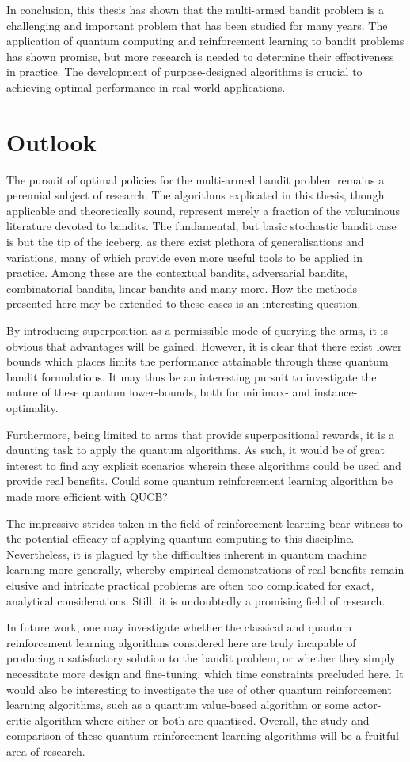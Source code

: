 In conclusion, this thesis has shown that the multi-armed bandit problem is a challenging and important problem that has been studied for many years.
The application of quantum computing and reinforcement learning to bandit problems has shown promise, but more research is needed to determine their effectiveness in practice.
The development of purpose-designed algorithms is crucial to achieving optimal performance in real-world applications.

\section{Outlook}
The pursuit of optimal policies for the multi-armed bandit problem remains a perennial subject of research.
The algorithms explicated in this thesis, though applicable and theoretically sound, represent merely a fraction of the voluminous literature devoted to bandits.
The fundamental, but basic stochastic bandit case is but the tip of the iceberg, as there exist plethora of generalisations and variations, many of which provide even more useful tools to be applied in practice.
Among these are the contextual bandits, adversarial bandits, combinatorial bandits, linear bandits and many more.
How the methods presented here may be extended to these cases is an interesting question.

By introducing superposition as a permissible mode of querying the arms, it is obvious that advantages will be gained.
However, it is clear that there exist lower bounds which places limits the performance attainable through these quantum bandit formulations.
It may thus be an interesting pursuit to investigate the nature of these quantum lower-bounds, both for minimax- and instance-optimality.

Furthermore, being limited to arms that provide superpositional rewards, it is a daunting task to apply the quantum algorithms.
As such, it would be of great interest to find any explicit scenarios wherein these algorithms could be used and provide real benefits.
Could some quantum reinforcement learning algorithm be made more efficient with QUCB?

The impressive strides taken in the field of reinforcement learning bear witness to the potential efficacy of applying quantum computing to this discipline.
Nevertheless, it is plagued by the difficulties inherent in quantum machine learning more generally, whereby empirical demonstrations of real benefits remain elusive and intricate practical problems are often too complicated for exact, analytical considerations.
Still, it is undoubtedly a promising field of research.

In future work, one may investigate whether the classical and quantum reinforcement learning algorithms considered here are truly incapable of producing a satisfactory solution to the bandit problem, or whether they simply necessitate more design and fine-tuning, which time constraints precluded here.
It would also be interesting to investigate the use of other quantum reinforcement learning algorithms, such as a quantum value-based algorithm or some actor-critic algorithm where either or both are quantised.
Overall, the study and comparison of these quantum reinforcement learning algorithms will be a fruitful area of research.
